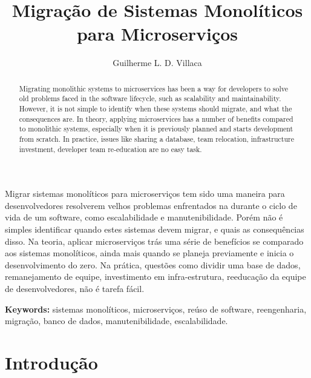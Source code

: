 \documentclass[12pt]{article}
\title{Migração de Sistemas Monolíticos para Microserviços}
\author{Guilherme L. D. Villaca\inst{1}}
\begin{document}
 

\maketitle

\begin{abstract}
Migrating monolithic systems to microservices has been a way for developers to solve old problems faced in the software lifecycle, such as scalability and maintainability. However, it is not simple to identify when these systems should migrate, and what the consequences are. In theory, applying microservices has a number of benefits compared to monolithic systems, especially when it is previously planned and starts development from scratch. In practice, issues like sharing a database, team relocation, infrastructure investment, developer team re-education are no easy task.
\end{abstract}
     
\begin{resumo} 
Migrar sistemas monolíticos para microserviços tem sido uma maneira para desenvolvedores resolverem velhos problemas enfrentados na durante o ciclo de vida de um software, como escalabilidade e manutenibilidade. Porém não é simples identificar quando estes sistemas devem migrar, e quais as consequências disso. Na teoria, aplicar microserviços trás uma série de benefícios se comparado aos sistemas monolíticos, ainda mais quando se planeja previamente e inicia o desenvolvimento do zero. Na prática, questões como dividir uma base de dados, remanejamento de equipe, investimento em infra-estrutura, reeducação da equipe de desenvolvedores, não é tarefa fácil.
\end{resumo}

{\bf Keywords:} sistemas monolíticos, microserviços, reúso de software, reengenharia, migração, banco de dados, manutenibilidade, escalabilidade.


\section{Introdução}

\end{document}
